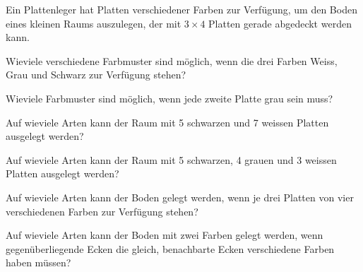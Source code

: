 Ein Plattenleger hat Platten verschiedener Farben zur Verfügung, um
den Boden eines kleinen Raums auszulegen, der mit $3\times 4$ Platten
gerade abgedeckt werden kann.
\begin{teilaufgaben}
\item
Wieviele verschiedene Farbmuster sind möglich, wenn die drei
Farben Weiss, Grau und Schwarz zur Verfügung stehen?
\item
Wieviele Farbmuster sind möglich, wenn jede zweite Platte 
grau sein muss?
\item
Auf wieviele Arten kann der Raum mit 5 schwarzen und 7 weissen 
Platten ausgelegt werden?
\item
Auf wieviele Arten kann der Raum mit 5 schwarzen, 4 grauen
und 3 weissen Platten ausgelegt werden?
\item
Auf wieviele Arten kann der Boden gelegt werden, wenn je drei Platten
von vier verschiedenen Farben zur Verfügung stehen?
\item
Auf wieviele Arten kann der Boden mit zwei Farben gelegt
werden, wenn gegenüberliegende Ecken die gleich, benachbarte 
Ecken verschiedene Farben haben müssen?
\end{teilaufgaben}


